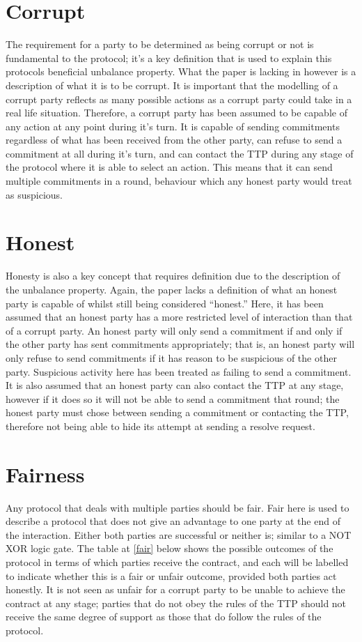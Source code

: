 \documentclass{l4proj}
\begin{document}
\section{Corrupt}

The requirement for a party to be determined as being corrupt or not is fundamental to the protocol; it's a key definition that is used to explain this protocols beneficial unbalance property. What the paper is lacking in however is a description of what it is to be corrupt. It is important that the modelling of a corrupt party reflects as many possible actions as a corrupt party could take in a real life situation. Therefore, a corrupt party has been assumed to be capable of any action at any point during it's turn. It is capable of sending commitments regardless of what has been received from the other party, can refuse to send a commitment at all during it's turn, and can contact the TTP during any stage of the protocol where it is able to select an action. This means that it can send multiple commitments in a round, behaviour which any honest party would treat as suspicious.

\section{Honest}

Honesty is also a key concept that requires definition due to the description of the unbalance property. Again, the paper lacks a definition of what an honest party is capable of whilst still being considered ``honest.'' Here, it has been assumed that an honest party has a more restricted level of interaction than that of a corrupt party. An honest party will only send a commitment if and only if the other party has sent commitments appropriately; that is, an honest party will only refuse to send commitments if it has reason to be suspicious of the other party. Suspicious activity here has been treated as failing to send a commitment. It is also assumed that an honest party can also contact the TTP at any stage, however if it does so it will not be able to send a commitment that round; the honest party must chose between sending a commitment or contacting the TTP, therefore not being able to hide its attempt at sending a resolve request.

\section{Fairness}

Any protocol that deals with multiple parties should be fair. Fair here is used to describe a protocol that does not give an advantage to one party at the end of the interaction. Either both parties are successful or neither is; similar to a NOT XOR logic gate. The table at \ref{fair} below shows the possible outcomes of the protocol in terms of which parties receive the contract, and each will be labelled to indicate whether this is a fair or unfair outcome, provided both parties act honestly. It is not seen as unfair for a corrupt party to be unable to achieve the contract at any stage; parties that do not obey the rules of the TTP should not receive the same degree of support as those that do follow the rules of the protocol.
\end{document}
